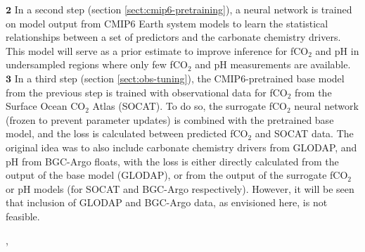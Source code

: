 \documentclass{article}
\begin{document}
	\underline{$\mathbf{2}$}\hspace{0.2cm} In a second step (section \ref{sect:cmip6-pretraining}), a neural network is trained on model output from CMIP6 Earth system models to learn the statistical relationships between a set of predictors and the carbonate chemistry drivers. This model will serve as a prior estimate to improve inference for fCO$_2$ and pH in undersampled regions where only few fCO$_2$ and pH measurements are available. \\
	
	\underline{$\mathbf{3}$}\hspace{0.2cm} In a third step (section \ref{sect:obs-tuning}), the CMIP6-pretrained base model from the previous step is trained with observational data for fCO$_2$ from the Surface Ocean CO$_2$ Atlas (SOCAT). To do so, the surrogate fCO$_2$ neural network (frozen to prevent parameter updates) is combined with the pretrained base model, and the loss is calculated between predicted fCO$_2$ and SOCAT data. The original idea was to also include carbonate chemistry drivers from GLODAP, and pH from BGC-Argo floats, with the loss is either directly calculated from the output of the base model (GLODAP), or from the output of the surrogate fCO$_2$ or pH models (for SOCAT and BGC-Argo respectively). However, it will be seen that inclusion of GLODAP and BGC-Argo data, as envisioned here, is not feasible.
	
	, 
	
\end{document}
